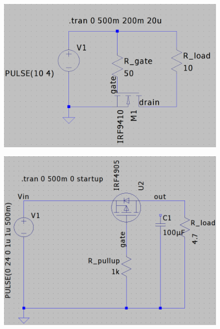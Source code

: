 \documentclass[../main.tex]{subfiles}
\begin{document}
    \begin{figure}[!h]
        \centering
        \begin{minipage}{.4\textwidth}
          \centering
          \includegraphics[width=\linewidth]{media/nmos_switch.png}
          \label{fig:simple_nmos_switch}
        \end{minipage}\qquad
        \begin{minipage}{.4\textwidth}
          \centering
          \includegraphics[width=\linewidth]{media/pmos_switch.png}
          \label{fig:simple_pmos_switch}
        \end{minipage}
    \end{figure}
\end{document}

